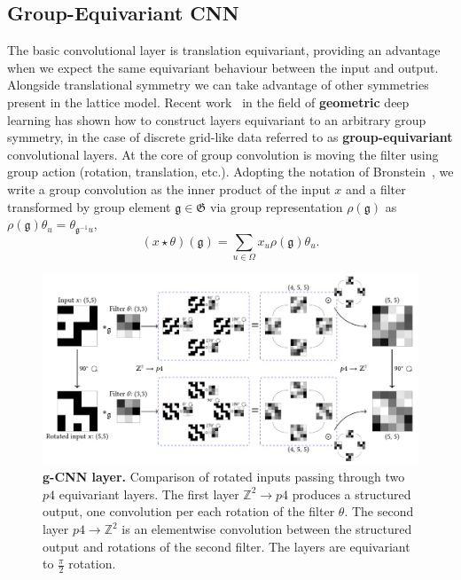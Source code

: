 \subsection{Group-Equivariant CNN}
The basic convolutional layer is translation equivariant, providing an advantage when we expect the same equivariant behaviour between the input and output. Alongside translational symmetry we can take advantage of other symmetries present in the lattice model. Recent work~\cite{bronstein2021geometric, cohen2016group} in the field of \textbf{geometric} deep learning has shown how to construct layers equivariant to an arbitrary group symmetry, in the case of discrete grid-like data referred to as \textbf{group-equivariant} convolutional layers. At the core of {group convolution} is moving the filter using group action (rotation, translation, etc.). Adopting the notation of Bronstein~\cite{bronstein2021geometric}, we write a group convolution as the inner product of the input $x$ and a filter transformed by group element $\mathfrak{g} \in \mathfrak{G}$ via group representation $\rho(\mathfrak{g})$ as $\rho(\mathfrak{g}) \theta_{u}=\theta_{\mathfrak{g}^{-1} u}$,
\begin{equation}
(x \star \theta)(\mathfrak{g})=\sum_{u \in \Omega} x_{u} \rho(\mathfrak{g}) \theta_{u}.
\end{equation}
\begin{figure}[h]
	\centering
	\includegraphics[width=\linewidth]{Chapter4/Figs/Vector/gcnn}
	\caption[Group-equivariant convolution]{\textbf{g-CNN layer.} Comparison of rotated inputs passing through two $p4$ equivariant layers. The first layer $\mathbb{Z}^2 \rightarrow p4$ produces a structured output, one convolution per each rotation of the filter $\theta$. The second layer $p4 \rightarrow \mathbb{Z}^2$ is an elementwise convolution between the structured output and rotations of the second filter. The layers are equivariant to $\frac{\pi}{2}$ rotation.}
	\label{fig:gcnn}
\end{figure}
